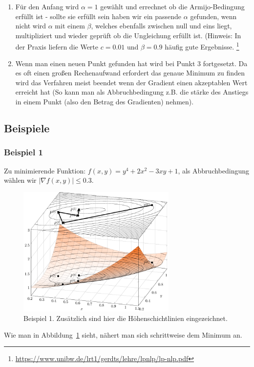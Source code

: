 \documentclass[naustrian]{article}
\begin{document}
{\begin{enumerate}
        $\varphi(\alpha) \leq \varphi(0) + c * \alpha^{[n]} * \varphi(0)'$.
        \\\\ Wobei $c$ eine Konstante zwischen null und eins ist und dazu
        dient das die Bedingung nicht zu restriktiv ist, $\varphi(\alpha) = f(P^{[n]} + \alpha^{[n]}s^{[n]})$
        und $\varphi(0)' = {\nabla}f(P^{n}) * s^{[n]}$
    \item Für den Anfang wird $\alpha=1$ gewählt und errechnet ob die Armijo-Bedingung
        erfüllt ist - sollte sie erfüllt sein haben wir ein passende $\alpha$
        gefunden, wenn nicht wird $\alpha$ mit einem $\beta$, welches ebenfalls
        zwischen null und eins liegt, multipliziert und wieder geprüft ob
        die Ungleichung erfüllt ist. (Hinweis: In der Praxis liefern die Werte
        $c = 0.01$ und $\beta = 0.9$ häufig gute Ergebnisse.
        \footnote{\href{https://www.unibw.de/lrt1/gerdts/lehre/lpnlp/lp-nlp.pdf}{https://www.unibw.de/lrt1/gerdts/lehre/lpnlp/lp-nlp.pdf}}
    \item Wenn man einen neuen Punkt gefunden hat wird bei Punkt 3 fortgesetzt.
        Da es oft einen großen Rechenaufwand erfordert das genaue Minimum
        zu finden wird das Verfahren meist beendet wenn der Gradient einen
        akzeptablen Wert erreicht hat (So kann man als Abbruchbedingung z.B.
        die stärke des Anstiegs in einem Punkt (also den Betrag des Gradienten)
        nehmen).
\end{enumerate}

\subsection{Beispiele}
\subsubsection{Beispiel 1}
Zu minimierende Funktion: $f(x,y)=y^4+2x^2-3xy+1$, als Abbruchbedingung wählen
wir $|{\nabla}f(x,y)| \leq 0.3$.

\begin{figure}[H]
    \centering
    \includegraphics[width=0.7\textwidth]{grad/figure1}
    \caption{Beispiel 1. Zusätzlich sind hier die Höhenschichtlinien eingezeichnet.}
    \label{bsp1}
\end{figure}
Wie man in Abbildung~\ref{bsp1} sieht, nähert man sich schrittweise dem
Minimum an.

}
\end{document}
